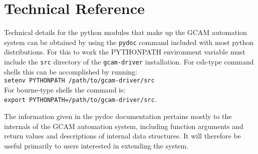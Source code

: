 \documentclass[11pt]{article}
\begin{document}
\appendix
\section{Technical Reference}
Technical details for the python modules that make up the GCAM
automation system can be obtained by using the \texttt{pydoc} command
included with most python distributions.  For this to work the
PYTHONPATH environment variable must include the \texttt{src}
directory of the \texttt{gcam-driver} installation.  For csh-type
command shells this can be accomplished by running:\\ 
\texttt{setenv PYTHONPATH /path/to/gcam-driver/src}\\
For bourne-type shells the command is:\\
\texttt{export PYTHONPATH=/path/to/gcam-driver/src}.

The information given in the pydoc documentation pertains mostly to
the internals of the GCAM automation system, including function
arguments and return values and descriptions of internal data
structures.  It will therefore be useful primarily to users interested
in extending the system.
\end{document}
